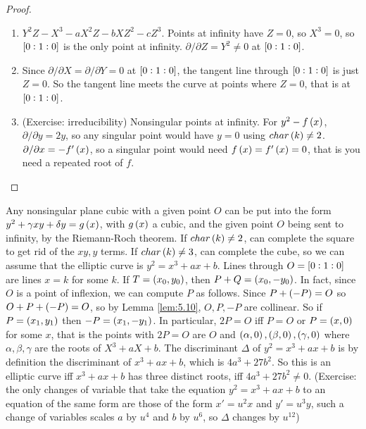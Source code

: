 \begin{proof}
\hfill
\begin{enumerate}
\item $ Y^2Z - X^3 - aX^2Z - bXZ^2 - cZ^3 $. Points at infinity have $ Z = 0 $, so $ X^3 = 0 $, so $ \sbr{0 : 1 : 0} $ is the only point at infinity. $ \partial / \partial Z = Y^2 \ne 0 $ at $ \sbr{0 : 1 : 0} $.
\item Since $ \partial / \partial X = \partial / \partial Y = 0 $ at $ \sbr{0 : 1 : 0} $, the tangent line through $ \sbr{0 : 1 : 0} $ is just $ Z = 0 $. So the tangent line meets the curve at points where $ Z = 0 $, that is at $ \sbr{0 : 1 : 0} $.
\item (Exercise: irreducibility) Nonsingular points at infinity. For $ y^2 - f\br{x} $, $ \partial / \partial y = 2y $, so any singular point would have $ y = 0 $ using $ char\br{k} \ne 2 $. $ \partial / \partial x = -f'\br{x} $, so a singular point would need $ f\br{x} = f'\br{x} = 0 $, that is you need a repeated root of $ f $.
\end{enumerate}
\end{proof}

\begin{fact*}
Any nonsingular plane cubic with a given point $ O $ can be put into the form $ y^2 + \gamma xy + \delta y = g\br{x} $, with $ g\br{x} $ a cubic, and the given point $ O $ being sent to infinity, by the Riemann-Roch theorem. If $ char\br{k} \ne 2 $, can complete the square to get rid of the $ xy, y $ terms. If $ char\br{k} \ne 3 $, can complete the cube, so we can assume that the elliptic curve is $ y^2 = x^3 + ax + b $. Lines through $ O = \sbr{0 : 1 : 0} $ are lines $ x = k $ for some $ k $. If $ T = \br{x_0, y_0} $, then $ P + Q = \br{x_0, -y_0} $. In fact, since $ O $ is a point of inflexion, we can compute $ P $ as follows. Since $ P + \br{-P} = O $ so $ O + P + \br{-P} = O $, so by Lemma \ref{lem:5.10}, $ O, P, -P $ are collinear. So if $ P = \br{x_1, y_1} $ then $ -P = \br{x_1, -y_1} $. In particular, $ 2P = O $ iff $ P = O $ or $ P = \br{x, 0} $ for some $ x $, that is the points with $ 2P = O $ are $ O $ and $ \br{\alpha, 0}, \br{\beta, 0}, \br{\gamma, 0} $ where $ \alpha, \beta, \gamma $ are the roots of $ X^3 + aX + b $. The discriminant $ \Delta $ of $ y^2 = x^3 + ax + b $ is by definition the discriminant of $ x^3 + ax + b $, which is $ 4a^3 + 27b^2 $. So this is an elliptic curve iff $ x^3 + ax + b $ has three distinct roots, iff $ 4a^3 + 27b^2 \ne 0 $. (Exercise: the only changes of variable that take the equation $ y^2 = x^3 + ax + b $ to an equation of the same form are those of the form $ x' = u^2x $ and $ y' = u^3y $, such a change of variables scales $ a $ by $ u^4 $ and $ b $ by $ u^6 $, so $ \Delta $ changes by $ u^{12} $)
\end{fact*}

